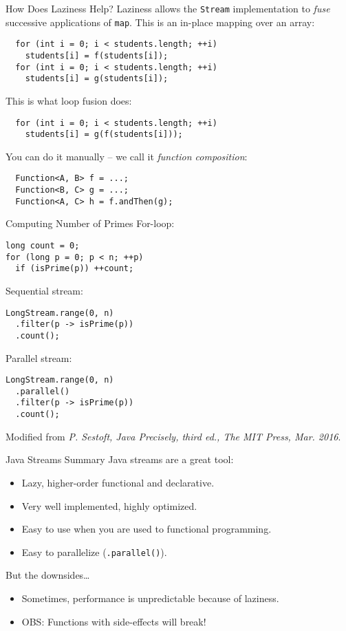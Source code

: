 \documentclass{beamer}
\begin{document}
\begin{frame}[fragile]{How Does Laziness Help?}
Laziness allows the \lstinline{Stream} implementation to \emph{fuse} successive applications of \lstinline{map}. This is an in-place mapping over an array:

\begin{lstlisting}
  for (int i = 0; i < students.length; ++i)
    students[i] = f(students[i]);
  for (int i = 0; i < students.length; ++i)
    students[i] = g(students[i]);
\end{lstlisting}

\pause{} This is what loop fusion does:
\begin{lstlisting}
  for (int i = 0; i < students.length; ++i)
    students[i] = g(f(students[i]));
\end{lstlisting}

\pause{} You can do it manually -- we call it \emph{function composition}:
\begin{lstlisting}
  Function<A, B> f = ...;
  Function<B, C> g = ...;
  Function<A, C> h = f.andThen(g);
\end{lstlisting}
\end{frame}

\begin{frame}[fragile]{Computing Number of Primes}
For-loop:
\begin{lstlisting}
long count = 0;
for (long p = 0; p < n; ++p)
  if (isPrime(p)) ++count;
\end{lstlisting}

\pause{} Sequential stream:
\begin{lstlisting}
LongStream.range(0, n)
  .filter(p -> isPrime(p))
  .count();
\end{lstlisting}

\pause{} Parallel stream:
\begin{lstlisting}
LongStream.range(0, n)
  .parallel()
  .filter(p -> isPrime(p))
  .count();
\end{lstlisting}

\footnotesize{Modified from \emph{P. Sestoft, Java Precisely, third ed., The MIT Press, Mar. 2016}.}
\end{frame}

\begin{frame}{Java Streams Summary}
  Java streams are a great tool:
  \begin{itemize}
  \item Lazy, higher-order functional and declarative.
  \item Very well implemented, highly optimized.
  \item Easy to use when you are used to functional programming.
  \item Easy to parallelize (\lstinline{.parallel()}).
  \end{itemize}

  \pause{} But the downsides\dots{}
  \begin{itemize}
  \item Sometimes, performance is unpredictable because of laziness.
  \item OBS: Functions with side-effects will break!
  \end{itemize}
\end{frame}
\end{document}
